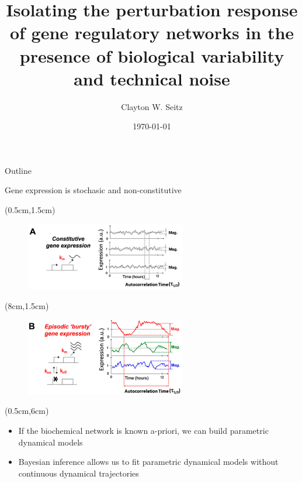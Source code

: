 \documentclass[aspectratio=1610]{beamer}					%
\title{Isolating the perturbation response of gene regulatory networks in the presence of biological variability and technical noise}	%
\author{Clayton W. Seitz}								%
\date{\today}									%
\begin{document}
\begin{frame}
  \titlepage
\end{frame}

\begin{frame}{Outline}
  \tableofcontents
\end{frame}


%

\begin{frame}{Gene expression is stochasic and non-constitutive}


\begin{textblock*}{7cm}(0.5cm,1.5cm)
\begin{figure}
\includegraphics[width=7cm]{burst-1.png}
\end{figure}
\end{textblock*}

\begin{textblock*}{7cm}(8cm,1.5cm)
\begin{figure}
\includegraphics[width=7cm]{burst-2.png}
\end{figure}
\end{textblock*}


\begin{textblock*}{15cm}(0.5cm,6cm)
\begin{itemize}
\item If the biochemical network is known a-priori, we can build parametric dynamical models
\item Bayesian inference allows us to fit parametric dynamical models without continuous dynamical trajectories
\end{itemize}
\end{textblock*}


\end{frame}
\end{document}
